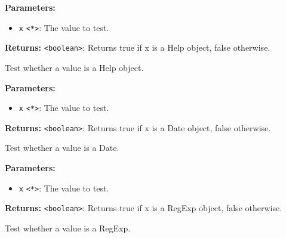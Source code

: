 \documentclass[12pt,a4paper]{article}
\begin{document}
\vspace{5mm}
\noindent {}


\noindent \textbf{Parameters:}
\begin{itemize}
  \item \texttt{x} \texttt{<*>}: The value to test.
\end{itemize}

\noindent \textbf{Returns:} \texttt{<boolean>}: Returns true if \textasciigrave{}x\textasciigrave{} is a Help object, false otherwise.

\noindent Test whether a value is a Help object.

\vspace{5mm}
\noindent {}


\noindent \textbf{Parameters:}
\begin{itemize}
  \item \texttt{x} \texttt{<*>}: The value to test.
\end{itemize}

\noindent \textbf{Returns:} \texttt{<boolean>}: Returns true if \textasciigrave{}x\textasciigrave{} is a Date object, false otherwise.

\noindent Test whether a value is a Date.

\vspace{5mm}
\noindent {}


\noindent \textbf{Parameters:}
\begin{itemize}
  \item \texttt{x} \texttt{<*>}: The value to test.
\end{itemize}

\noindent \textbf{Returns:} \texttt{<boolean>}: Returns true if \textasciigrave{}x\textasciigrave{} is a RegExp object, false otherwise.

\noindent Test whether a value is a RegExp.

\vspace{5mm}
\noindent {}
\end{document}
